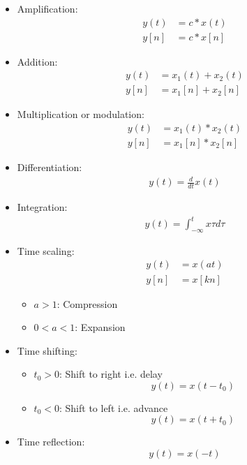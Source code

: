 \documentclass[conference]{IEEEtran}
\begin{document}
\begin{itemize}
  \item Amplification:
  \begin{align*}
    y(t) &= c*x(t) \\
    y[n] &= c*x[n]
  \end{align*}

  \item Addition:
  \begin{align*}
    y(t) &= x_1(t) + x_2(t) \\
    y[n] &= x_1[n] + x_2[n]
  \end{align*}

  \item Multiplication or modulation:
  \begin{align*}
    y(t) &= x_1(t)*x_2(t) \\
    y[n] &= x_1[n]*x_2[n]
  \end{align*}

  \item Differentiation:
  \begin{align*}
    y(t) = \frac{d}{dt}x(t)
  \end{align*}

  \item Integration:
  \begin{align*}
    y(t) = \int_{-\infty}^t x{\tau} d\tau 
  \end{align*}

  \item Time scaling:
  \begin{align*}
    y(t) &= x(at) \\
    y[n] &= x[kn]
  \end{align*}
  \begin{itemize}
    \item $a>1$: Compression
    \item $0<a<1$: Expansion
  \end{itemize}

  \item Time shifting:
  \begin{itemize}
    \item $t_0 > 0$: Shift to right i.e. delay
    $$
    y(t) = x(t - t_0)
    $$
    \item $t_0 < 0$: Shift to left i.e. advance
    $$
    y(t) = x(t + t_0)
    $$
  \end{itemize}

  \item Time reflection:
  $$
    y(t) = x(-t)
  $$
\end{itemize}
\end{document}
